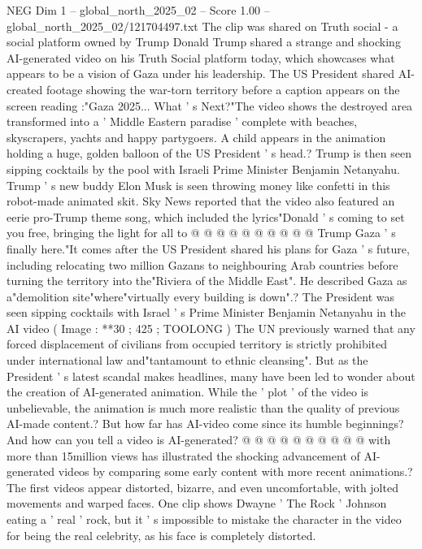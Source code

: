 \begin{textsample}{NEG Dim 1 – global\_north\_2025\_02 – Score 1.00 – global\_north\_2025\_02/121704497.txt}  \label{ex:f1_neg_016}
The clip was shared on Truth social - a social platform owned by Trump Donald Trump shared a strange and shocking AI-generated video on his Truth Social platform today, which showcases what appears to be a vision of Gaza under his leadership.
The US President shared AI-created footage showing the war-torn territory before a caption appears on the screen reading :"Gaza 2025...
What ' s Next?"The video shows the destroyed area transformed into a ' Middle Eastern paradise ' complete with beaches, skyscrapers, yachts and happy partygoers.
A child appears in the animation holding a huge, golden balloon of the US President ' s head.?
Trump is then seen sipping cocktails by the pool with Israeli Prime Minister Benjamin Netanyahu.
Trump ' s new buddy Elon Musk is seen throwing money like confetti in this robot-made animated skit.
Sky News reported that the video also featured an eerie pro-Trump theme song, which included the lyrics"Donald ' s coming to set you free, bringing the light for all to @ @ @ @ @ @ @ @ @ @ Trump Gaza ' s finally here."It comes after the US President shared his plans for Gaza ' s future, including relocating two million Gazans to neighbouring Arab countries before turning the territory into the"Riviera of the Middle East".
He described Gaza as a"demolition site"where"virtually every building is down".?
The President was seen sipping cocktails with Israel ' s Prime Minister Benjamin Netanyahu in the AI video ( Image : **30 ; 425 ; TOOLONG ) The UN previously warned that any forced displacement of civilians from occupied territory is strictly prohibited under international law and"tantamount to ethnic cleansing".
But as the President ' s latest scandal makes headlines, many have been led to wonder about the creation of AI-generated animation.
While the ' plot ' of the video is unbelievable, the animation is much more realistic than the quality of previous AI-made content.?
But how far has AI-video come since its humble beginnings?
And how can you tell a video is AI-generated? @ @ @ @ @ @ @ @ @ @ with more than 15million views has illustrated the shocking advancement of AI-generated videos by comparing some early content with more recent animations.?
The first videos appear distorted, bizarre, and even uncomfortable, with jolted movements and warped faces.
One clip shows Dwayne ' The Rock ' Johnson eating a ' real ' rock, but it ' s impossible to mistake the character in the video for being the real celebrity, as his face is completely distorted.

\end{textsample}
